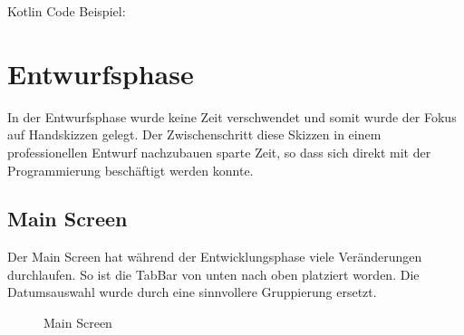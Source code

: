 \documentclass[
    DIV12,
    cleardouble=plain,
    headings=normal,
    pdftex,
    headexclude,footexclude,
    final
]{scrreprt}
\begin{document}
Kotlin Code Beispiel:


\newpage

\chapter{Entwurfsphase}
In der Entwurfsphase wurde keine Zeit verschwendet und somit wurde der Fokus auf Handskizzen gelegt. Der Zwischenschritt diese Skizzen in einem professionellen Entwurf nachzubauen sparte Zeit, so dass sich direkt mit der Programmierung beschäftigt werden konnte.



\section{Main Screen}
Der Main Screen hat während der Entwicklungsphase viele Veränderungen durchlaufen. So ist die TabBar von unten nach oben platziert worden. Die Datumsauswahl wurde durch eine sinnvollere Gruppierung ersetzt.
\begin{figure}[H]
	\centering
	\caption{Main Screen}
	\label{main}
\end{figure}
\end{document}
